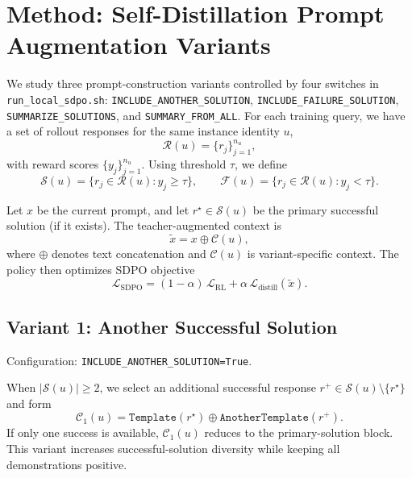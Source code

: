 \section{Method: Self-Distillation Prompt Augmentation Variants}
\label{sec:method}

We study three prompt-construction variants controlled by four switches in
\texttt{run\_local\_sdpo.sh}:
\texttt{INCLUDE\_ANOTHER\_SOLUTION},
\texttt{INCLUDE\_FAILURE\_SOLUTION},
\texttt{SUMMARIZE\_SOLUTIONS}, and
\texttt{SUMMARY\_FROM\_ALL}.
For each training query, we have a set of rollout responses for the same instance identity $u$,
\begin{equation}
\mathcal{R}(u)=\{r_j\}_{j=1}^{n_u},
\end{equation}
with reward scores $\{y_j\}_{j=1}^{n_u}$. Using threshold $\tau$, we define
\begin{equation}
\mathcal{S}(u)=\{r_j\in\mathcal{R}(u): y_j\ge\tau\},\qquad
\mathcal{F}(u)=\{r_j\in\mathcal{R}(u): y_j<\tau\}.
\end{equation}

Let $x$ be the current prompt, and let $r^{\star}\in\mathcal{S}(u)$ be the primary successful solution
(if it exists). The teacher-augmented context is
\begin{equation}
\tilde{x}=x \oplus \mathcal{C}(u),
\end{equation}
where $\oplus$ denotes text concatenation and $\mathcal{C}(u)$ is variant-specific context.
The policy then optimizes SDPO objective
\begin{equation}
\mathcal{L}_{\text{SDPO}}=(1-\alpha)\,\mathcal{L}_{\text{RL}}+\alpha\,\mathcal{L}_{\text{distill}}(\tilde{x}).
\end{equation}

\subsection{Variant 1: Another Successful Solution}
Configuration:
\texttt{INCLUDE\_ANOTHER\_SOLUTION=True}.

When $|\mathcal{S}(u)|\ge 2$, we select an additional successful response
$r^{+}\in\mathcal{S}(u)\setminus\{r^{\star}\}$ and form
\begin{equation}
\mathcal{C}_1(u)=\texttt{Template}(r^{\star})\oplus\texttt{AnotherTemplate}(r^{+}).
\end{equation}
If only one success is available, $\mathcal{C}_1(u)$ reduces to the primary-solution block.
This variant increases successful-solution diversity while keeping all demonstrations positive.

